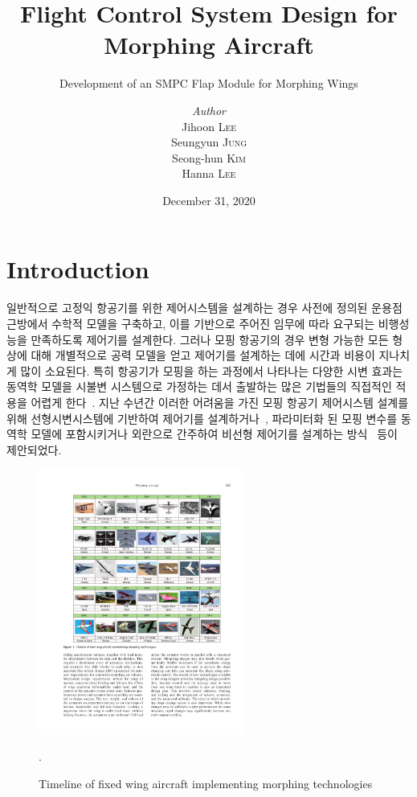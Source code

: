 \documentclass[a4paper, 12pt]{report}
\institute{Seoul National University}
\title{Flight Control System Design for Morphing Aircraft}
\subtitle{Development of an SMPC Flap Module for Morphing Wings}
\author{\textit{Author}\\Jihoon \textsc{Lee}\\Seungyun \textsc{Jung}\\Seong-hun \textsc{Kim}\\Hanna \textsc{Lee}}
\date{December 31, 2020}
\begin{document}
	\maketitle
	\romantableofcontents
	
	\chapter{Introduction}
	일반적으로 고정익 항공기를 위한 제어시스템을 설계하는 경우 사전에 정의된 운용점 근방에서 수학적 모델을 구축하고, 이를 기반으로 주어진 임무에 따라 요구되는 비행성능을 만족하도록 제어기를 설계한다.
	그러나 모핑 항공기의 경우 변형 가능한 모든 형상에 대해 개별적으로 공력 모델을 얻고 제어기를 설계하는 데에 시간과 비용이 지나치게 많이 소요된다.
	특히 항공기가 모핑을 하는 과정에서 나타나는 다양한 시변 효과는 동역학 모델을 시불변 시스템으로 가정하는 데서 출발하는 많은 기법들의 직접적인 적용을 어렵게 한다~\cite{seigler_analysis_2009,chakravarthy_time-varying_2012}.
	지난 수년간 이러한 어려움을 가진 모핑 항공기 제어시스템 설계를 위해  선형시변시스템에 기반하여 제어기를 설계하거나~\cite{jiang_systematic_2015,lee_linear_2019}, 파라미터화 된 모핑 변수를 동역학 모델에 포함시키거나 외란으로 간주하여 비선형 제어기를 설계하는 방식~\cite{wu_modified_2017,lee_neural_2019,jung_disturbance_2020} 등이 제안되었다.
	
	\begin{figure}[h]
		\centering
		\includegraphics[width=0.6\textwidth]{./resources/pdf/history.pdf}
		\caption{Timeline of fixed wing aircraft implementing morphing technologies \cite{barbarino2011review}}.
		\label{fig:history}
	\end{figure}
	
\end{document}
